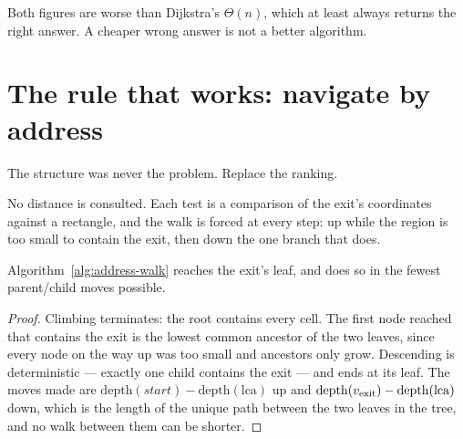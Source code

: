 \documentclass[11pt,a4paper]{article}
\begin{document}
\begin{keypoint}
Both figures are worse than Dijkstra's $\Theta(n)$, which at least always
returns the right answer. A cheaper wrong answer is not a better algorithm.
\end{keypoint}

\section{The rule that works: navigate by address}

The structure was never the problem. Replace the ranking.

\begin{algorithm}[H]
\caption{From the start's leaf to the exit's, by address.}
\label{alg:address-walk}
\BlankLine
{}
\end{algorithm}

No distance is consulted. Each test is a comparison of the exit's coordinates
against a rectangle, and the walk is forced at every step: up while the region
is too small to contain the exit, then down the one branch that does.

\begin{proposition}
Algorithm~\ref{alg:address-walk} reaches the exit's leaf, and does so in the
fewest parent/child moves possible.
\end{proposition}

\begin{proof}
Climbing terminates: the root contains every cell. The first node reached that
contains the exit is the lowest common ancestor of the two leaves, since every
node on the way up was too small and ancestors only grow. Descending is
deterministic --- exactly one child contains the exit --- and ends at its leaf.
The moves made are $\mathrm{depth}(\textit{start})-\mathrm{depth}(\mathrm{lca})$
up and $\mathrm{depth}(v_{\text{exit}})-\mathrm{depth}(\mathrm{lca})$ down, which is
the length of the unique path between the two leaves in the tree, and no walk
between them can be shorter.
\end{proof}
\end{document}
